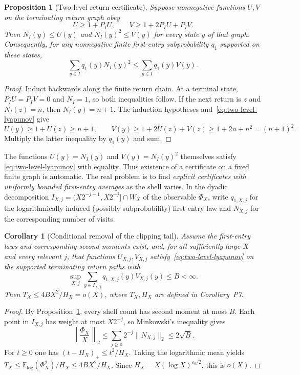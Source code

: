 \documentclass[11pt]{article}
\newtheorem{proposition}[theorem]{Proposition}
\newtheorem{corollary}[theorem]{Corollary}
\theoremstyle{remark}
\begin{document}
\begin{proposition}[Two-level return certificate]
\label{prop:lyapunov-return}
Suppose nonnegative functions $U,V$ on the terminating return graph obey
\begin{equation}\label{eq:two-level-lyapunov}
 U\ge1+P_IU,\qquad V\ge1+2P_IU+P_IV.
\end{equation}
Then $N_I(y)\le U(y)$ and $N_I(y)^2\le V(y)$ for every state $y$ of
that graph.  Consequently, for any nonnegative finite first-entry
subprobability $q_1$ supported on these states,
\begin{equation}\label{eq:lyapunov-second-moment}
 \sum_{y\in I}q_1(y)N_I(y)^2
 \le \sum_{y\in I}q_1(y)V(y).
\end{equation}
\end{proposition}
\begin{proof}
Induct backwards along the finite return chain.  At a terminal state,
$P_IU=P_IV=0$ and $N_I=1$, so both inequalities follow.  If the next
return is $z$ and $N_I(z)=n$, then $N_I(y)=n+1$.  The induction
hypotheses and~\eqref{eq:two-level-lyapunov} give
\[
 U(y)\ge1+U(z)\ge n+1,\qquad
 V(y)\ge1+2U(z)+V(z)\ge1+2n+n^2=(n+1)^2.
\]
Multiply the latter inequality by $q_1(y)$ and sum.
\end{proof}

The functions $U(y)=N_I(y)$ and $V(y)=N_I(y)^2$ themselves satisfy
\eqref{eq:two-level-lyapunov} with equality.  Thus existence of a
certificate on a fixed finite graph is automatic.  The real problem is
to find \emph{explicit certificates with uniformly bounded first-entry
averages} as the shell varies.  In the dyadic decomposition
$I_{X,j}=(X2^{-j-1},X2^{-j}]\cap W_X$ of the observable $\Phi_X$, write
$q_{1,X,j}$ for the logarithmically induced (possibly subprobability)
first-entry law and $N_{X,j}$ for the corresponding number of visits.

\begin{corollary}[Conditional removal of the clipping tail]
\label{cor:lyapunov-tail}
Assume the first-entry laws and corresponding second moments exist,
and, for all sufficiently large $X$ and every relevant $j$, that
functions $U_{X,j},V_{X,j}$ satisfy~\eqref{eq:two-level-lyapunov} on
the supported terminating return paths with
\begin{equation}\label{eq:lyapunov-uniform-open}
 \sup_{X,j}\sum_{y\in I_{X,j}}q_{1,X,j}(y)V_{X,j}(y)
 \le B<\infty.
\end{equation}
Then $T_X\le 4BX^2/H_X=o(X)$, where $T_X,H_X$ are defined in
Corollary~P7.
\end{corollary}
\begin{proof}
By Proposition~\ref{prop:lyapunov-return}, every shell count has second
moment at most $B$.  Each point in $I_{X,j}$ has weight at most
$X2^{-j}$, so Minkowski's inequality gives
\[
 \left\|\frac{\Phi_X}{X}\right\|_2
 \le\sum_{j\ge0}2^{-j}\|N_{X,j}\|_2\le2\sqrt B.
\]
For $t\ge0$ one has $(t-H_X)_+\le t^2/H_X$.  Taking the logarithmic
mean yields $T_X\le\mathbb E_{\log}(\Phi_X^2)/H_X\le4BX^2/H_X$.
Since $H_X=X(\log X)^{\varepsilon_0/2}$, this is $o(X)$.
\end{proof}
\end{document}
